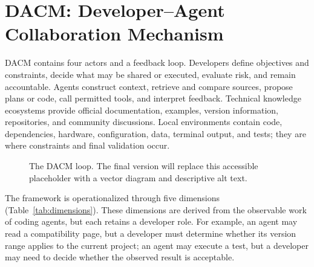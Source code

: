 \documentclass[manuscript,review,anonymous]{acmart}
\begin{document}
\section{DACM: Developer--Agent Collaboration Mechanism}

DACM contains four actors and a feedback loop. Developers define objectives and constraints, decide what may be shared or executed, evaluate risk, and remain accountable. Agents construct context, retrieve and compare sources, propose plans or code, call permitted tools, and interpret feedback. Technical knowledge ecosystems provide official documentation, examples, version information, repositories, and community discussions. Local environments contain code, dependencies, hardware, configuration, data, terminal output, and tests; they are where constraints and final validation occur.

\begin{figure}[t]
  \centering
  \caption{The DACM loop. The final version will replace this accessible placeholder with a vector diagram and descriptive alt text.}
  \label{fig:dacm}
\end{figure}

The framework is operationalized through five dimensions (Table~\ref{tab:dimensions}). These dimensions are derived from the observable work of coding agents, but each retains a developer role. For example, an agent may read a compatibility page, but a developer must determine whether its version range applies to the current project; an agent may execute a test, but a developer may need to decide whether the observed result is acceptable.
\end{document}
